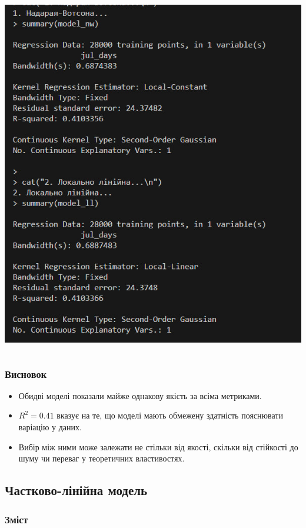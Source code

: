 ﻿\documentclass{beamer}
\begin{document}
\begin{frame}
\begin{columns}[T]
\begin{column}{0.48\textwidth}
  \includegraphics[width=\textwidth]{plots/lab4/kernal/40.jpg}
  \end{column}
  \end{columns}
 
\end{frame}


\begin{frame}
  \frametitle{Висновок}
  \begin{itemize}
    \item Обидві моделі показали майже однакову якість за всіма метриками. 
    \item $ R^2 = 0.41 $ вказує на те, що моделі мають обмежену здатність пояснювати варіацію у даних.
    \item Вибір між ними може залежати не стільки від якості, скільки від стійкості до шуму чи переваг у теоретичних властивостях.
  \end{itemize}
\end{frame}


\begin{frame}
  \section{Частково-лінійна модель}

  \frametitle{Зміст}
  \tableofcontents[currentsection]
\end{frame}
\end{document}
